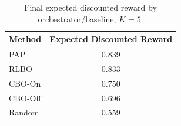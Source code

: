 %

\begin{table}[t]
\centering
\caption{Final expected discounted reward by orchestrator/baseline, $K{=}5$.}
\label{tab:final-performance}
\begin{tabular}{@{}lc@{}}
\toprule
Method & Expected Discounted Reward \\
\midrule
PAP      & 0.839 \\
RLBO     & 0.833 \\
CBO-On   & 0.750 \\
CBO-Off  & 0.696 \\
Random   & 0.559 \\
\bottomrule
\end{tabular}
\end{table}

